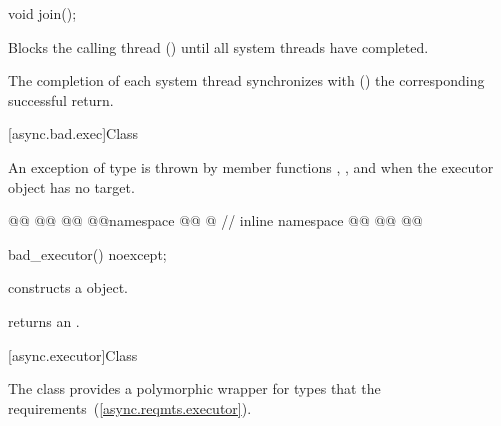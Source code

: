 %
\begin{itemdecl}
void join();
\end{itemdecl}

\begin{itemdescr}
\pnum
\effects Blocks the calling thread () until all system threads have completed.

\pnum
\sync The completion of each system thread synchronizes with () the corresponding successful  return.
\end{itemdescr}



[async.bad.exec]{Class }

%
\pnum
An exception of type  is thrown by  member functions , , and  when the executor object has no target.

\begin{codeblock}
@@
@@
@@
@@namespace @@ @ // inline namespace \namespacever
@@
@@
@@
\end{codeblock}

\begin{itemdecl}
bad_executor() noexcept;
\end{itemdecl}

\begin{itemdescr}
\pnum
\effects constructs a  object.

\pnum
\postconditions
{} returns an  \ntbs.
\end{itemdescr}



[async.executor]{Class }

%
\pnum
The  class provides a polymorphic wrapper for types that  the  requirements~(\ref{async.reqmts.executor}).

